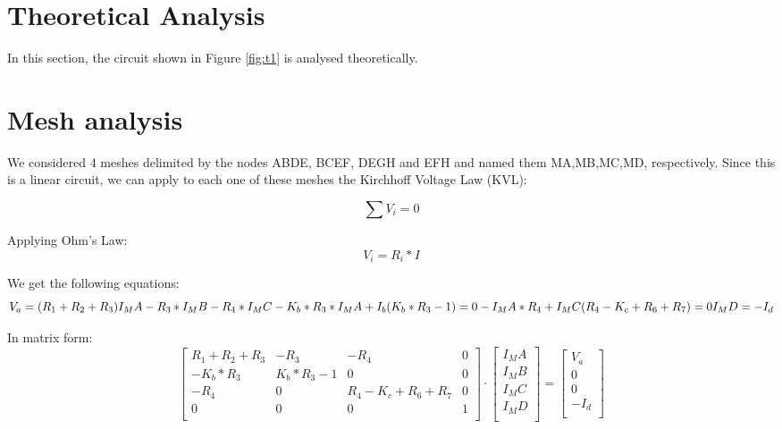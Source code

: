 \section{Theoretical Analysis}
\label{sec:analysis}

In this section, the circuit shown in Figure \ref{fig:t1} is analysed
theoretically.

\section{Mesh analysis}
We considered 4 meshes delimited by the nodes ABDE, BCEF, DEGH and EFH and named them MA,MB,MC,MD, respectively. Since this is a linear circuit, we can apply to each one of these meshes the Kirchhoff Voltage Law (KVL):


\begin{equation}
  \sum V_i = 0
  \label{eq:KVL}
\end{equation}

Applying Ohm's Law:
\begin{equation}
  V_i= R_i * I
  \label{eq:OhmLaw}
\end{equation}

We get the following equations:
\begin{equation}

    V_a = (R_1+R_2+R_3)I_MA - R_3*I_MB - R_4*I_MC\\
  
    -K_b*R_3*I_MA + I_b(K_b*R_3-1)=0\\
  
    -I_MA*R_4 + I_MC(R_4-K_c+R_6+R_7)=0\\
   
    I_MD= -I_d

  \label{eq:malhas}
\end{equation}

In matrix form:
  \begin{equation}\label{eq:matrixeqn}
\begin{bmatrix}
R_1+R_2+R_3 & -R_3 & -R_4 & 0 \\

-K_b*R_3 & K_b* R_3-1 & 0 & 0 \\

-R_4 & 0 & R_4-K_c+R_6+R_7 & 0 \\

0 & 0 & 0 & 1 \\
\end{bmatrix}


    \cdot
    \begin{bmatrix}
      I_MA \\
      I_MB \\
      I_MC \\
      I_MD \\
    \end{bmatrix}
    =
    \begin{bmatrix}
      V_a \\
      0 \\
      0 \\
      -I_d\\
    \end{bmatrix}
  \end{equation}